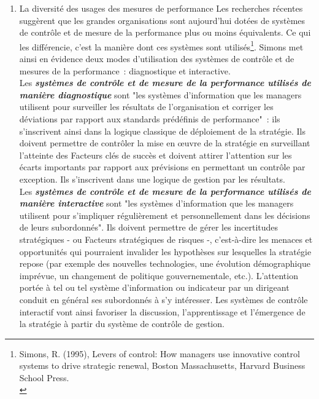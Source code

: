 \documentclass{tufte-handout}
\begin{document}
\begin{enumerate}
\item La diversité des usages des mesures de performance
\label{sec:org0af09b3}
Les recherches récentes suggèrent que les grandes organisations sont aujourd'hui dotées de systèmes de contrôle et de mesure de la performance plus ou moins équivalents. Ce qui les différencie, c'est la manière dont ces systèmes sont utilisés\footnote{Simons, R. (1995), Levers of control: How managers use innovative control systems to drive strategic renewal, Boston Massachusetts, Harvard Business School Press.\\}. Simons met ainsi en évidence deux modes d'utilisation des systèmes de contrôle et de mesures de la performance : diagnostique et interactive.\\

Les \emph{\textbf{systèmes de contrôle et de mesure de la performance utilisés de manière diagnostique}} sont "les systèmes d'information que les managers utilisent pour surveiller les résultats de l'organisation et corriger les déviations par rapport aux standards prédéfinis de performance" : ils s'inscrivent ainsi dans la logique classique de déploiement de la stratégie. Ils doivent permettre de contrôler la mise en œuvre de la stratégie en surveillant l'atteinte des Facteurs clés de succès et doivent attirer l'attention sur les écarts importants par rapport aux prévisions en permettant un contrôle par exception. Ils s'inscrivent dans une logique de gestion par les résultats.\\

Les \emph{\textbf{systèmes de contrôle et de mesure de la performance utilisés de manière interactive}} sont "les systèmes d'information que les managers utilisent pour s'impliquer régulièrement et personnellement dans les décisions de leurs subordonnés". Ils doivent permettre de gérer les incertitudes stratégiques - ou Facteurs stratégiques de risques -, c'est-à-dire les menaces et opportunités qui pourraient invalider les hypothèses sur lesquelles la stratégie repose (par exemple des nouvelles technologies, une évolution démographique imprévue, un changement de politique gouvernementale, etc.). L'attention portée à tel ou tel système d'information ou indicateur par un dirigeant conduit en général ses subordonnés à s'y intéresser. Les systèmes de contrôle interactif vont ainsi favoriser la discussion, l'apprentissage et l'émergence de la stratégie à partir du système de contrôle de gestion.\\


\end{enumerate}
\end{document}
